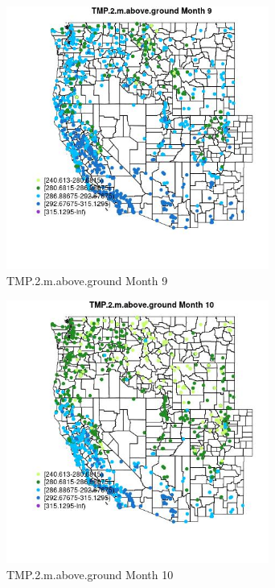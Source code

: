 \begin{figure} 
\centering  
\includegraphics[width=0.77\textwidth]{Code_Outputs/Report_ML_input_PM25_Step4_part_f_de_duplicated_aves_prioritize_24hr_obswNAs_MapObsMo9TMP2maboveground.jpg} 
\caption{\label{fig:Report_ML_input_PM25_Step4_part_f_de_duplicated_aves_prioritize_24hr_obswNAsMapObsMo9TMP2maboveground}TMP.2.m.above.ground Month 9} 
\end{figure} 
 

\begin{figure} 
\centering  
\includegraphics[width=0.77\textwidth]{Code_Outputs/Report_ML_input_PM25_Step4_part_f_de_duplicated_aves_prioritize_24hr_obswNAs_MapObsMo10TMP2maboveground.jpg} 
\caption{\label{fig:Report_ML_input_PM25_Step4_part_f_de_duplicated_aves_prioritize_24hr_obswNAsMapObsMo10TMP2maboveground}TMP.2.m.above.ground Month 10} 
\end{figure} 
 

